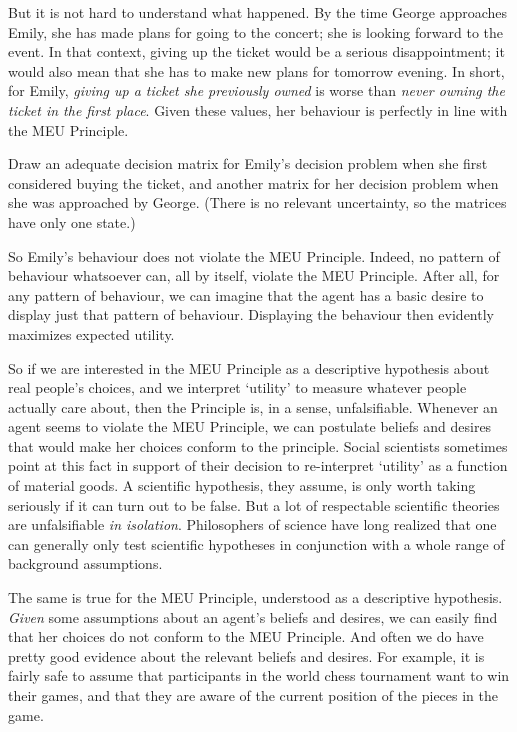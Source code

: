 But it is not hard to understand what happened. By the time George
approaches Emily, she has made plans for going to the concert; she is
looking forward to the event. In that context, giving up the ticket
would be a serious disappointment; it would also mean that she has to
make new plans for tomorrow evening. In short, for Emily, \emph{giving
  up a ticket she previously owned} is worse than \emph{never owning
  the ticket in the first place}. Given these values, her behaviour is
perfectly in line with the MEU Principle.

\begin{exercise2}
  Draw an adequate decision matrix for Emily's decision problem when
  she first considered buying the ticket, and another matrix for her
  decision problem when she was approached by George. (There is no
  relevant uncertainty, so the matrices have only one state.)
\end{exercise2}

So Emily's behaviour does not violate the MEU Principle. Indeed, no
pattern of behaviour whatsoever can, all by itself, violate the MEU
Principle. After all, for any pattern of behaviour, we can imagine
that the agent has a basic desire to display just that pattern of
behaviour. Displaying the behaviour then evidently maximizes expected
utility.

So if we are interested in the MEU Principle as a descriptive
hypothesis about real people's choices, and we interpret `utility' to
measure whatever people actually care about, then the Principle is, in
a sense, unfalsifiable. Whenever an agent seems to violate the MEU
Principle, we can postulate beliefs and desires that would make her
choices conform to the principle. Social scientists sometimes point at
this fact in support of their decision to re-interpret `utility' as a
function of material goods. A scientific hypothesis, they assume, is
only worth taking seriously if it can turn out to be false. But a lot
of respectable scientific theories are unfalsifiable \emph{in
  isolation}. Philosophers of science have long realized that one can
generally only test scientific hypotheses in conjunction with a whole
range of background assumptions.

The same is true for the MEU Principle, understood as a descriptive
hypothesis. \emph{Given} some assumptions about an agent's beliefs and
desires, we can easily find that her choices do not conform to the MEU
Principle. And often we do have pretty good evidence about the
relevant beliefs and desires. For example, it is fairly safe to assume
that participants in the world chess tournament want to win their
games, and that they are aware of the current position of the pieces
in the game.

